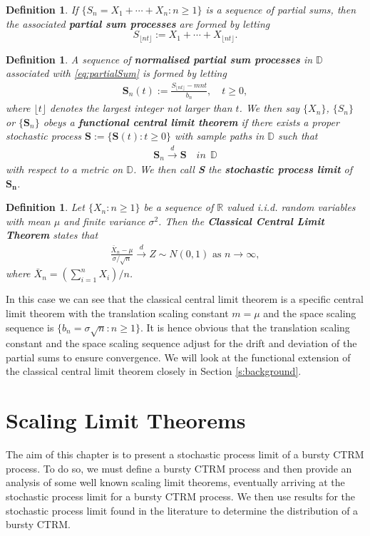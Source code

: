 \documentclass[honours,12pt,twoside, openright]{unswthesis}
\newcommand{\R}{\mathbb{R}}
\newcommand{\1}{\mathbf 1}
\newcommand{\Floor}[1]{{\lfloor {#1} \rfloor}}
\newcommand{\cd}{\overset{d}{\longrightarrow}}
\newcommand{\D}{\mathbb{D}}
\newtheorem{definition}[equation]{Definition}
\numberwithin{equation}{section}
\theoremstyle{definition}
\theoremstyle{remark}
\begin{document}
\begin{definition}
	If $\{S_n=X_1+\cdots+X_n:n\geq1\}$ is a sequence of partial sums, then the associated \textbf{partial sum processes} are formed by letting
	\[
		S_\Floor{nt}:=X_1+\cdots+X_\Floor{nt}.
	\]
\end{definition}

\begin{definition}
	A sequence of \textbf{normalised partial sum processes} in $\D$ associated with \ref{eq:partialSum} is formed by letting
	\begin{align}
		\textbf{S}_n(t):=\frac{S_\Floor{nt}-mnt}{b_n},\quad t\geq 0,
	\end{align}
	where $\lfloor t \rfloor$ denotes the largest integer not larger than $t$. We then say $\{X_n\}$, $\{S_n\}$ or $\{\textbf{S}_n\}$ obeys a \textbf{functional central limit theorem} if there exists a proper stochastic process $\textbf{S}:=\{\textbf{S}(t):t\geq0\}$ with sample paths in $\D$ such that
	\begin{align*}
		\textbf{S}_n \cd \textbf{S}\quad in\ \ \D
	\end{align*}
	with respect to a metric on $\D$. We then call \textbf{S} the \textbf{stochastic process limit} of $\boldsymbol{S_n}$.\\
\end{definition}


\begin{definition}
Let $\{X_n:n\geq1\}$ be a sequence of $\R$ valued i.i.d. random variables with mean $\mu$ and finite variance $\sigma^2$. Then the \textbf{Classical Central Limit Theorem} states that
\begin{align*}
	\frac{\bar{X}_n-\mu}{\sigma/\sqrt{n}} \cd Z \sim N(0,1) \textrm{ as 				$n\to\infty,$}
\end{align*}
where $\bar{X}_n=(\sum^n_{i=1}X_i)/n$.\\
\end{definition}
In this case we can see that the classical central limit theorem is a specific central limit theorem with the translation scaling constant $m=\mu$ and the space scaling sequence is $\{b_n=\sigma\sqrt{n}:n\geq1 \}$. It is hence obvious that the translation scaling constant and the space scaling sequence adjust for the drift and deviation of the partial sums to ensure convergence. We will look at the functional extension of the classical central limit theorem closely in Section \ref{s:background}.

\chapter{Scaling Limit Theorems}\label{ScalingLimits}
The aim of this chapter is to present a stochastic process limit of a bursty CTRM process. To do so, we must define a bursty CTRM process and then provide an analysis of some well known scaling limit theorems, eventually arriving at the stochastic process limit for a bursty CTRM process. We then use results for the stochastic process limit found in the literature \cite{MeerschaertStoev08} to determine the distribution of a bursty CTRM.
\end{document}
